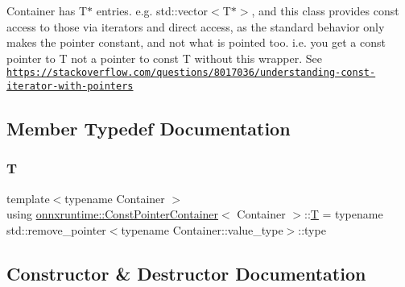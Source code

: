 Container has T$\ast$ entries. e.\+g. std\+::vector$<$\+T$\ast$$>$, and this class provides const access to those via iterators and direct access, as the standard behavior only makes the pointer constant, and not what is pointed too. i.\+e. you get a const pointer to T not a pointer to const T without this wrapper. See \href{https://stackoverflow.com/questions/8017036/understanding-const-iterator-with-pointers}{\tt https\+://stackoverflow.\+com/questions/8017036/understanding-\/const-\/iterator-\/with-\/pointers} 

\subsection{Member Typedef Documentation}
\mbox{\label{classonnxruntime_1_1ConstPointerContainer_ae78936c3220735b7dba8004b7d5c9888}} 
\subsubsection{\texorpdfstring{T}{T}}
{\footnotesize\ttfamily template$<$typename Container $>$ \\
using \mbox{\hyperlink{classonnxruntime_1_1ConstPointerContainer}{onnxruntime\+::\+Const\+Pointer\+Container}}$<$ Container $>$\+::\mbox{\hyperlink{classonnxruntime_1_1ConstPointerContainer_ae78936c3220735b7dba8004b7d5c9888}{T}} =  typename std\+::remove\+\_\+pointer$<$typename Container\+::value\+\_\+type$>$\+::type}



\subsection{Constructor \& Destructor Documentation}
\mbox{\label{classonnxruntime_1_1ConstPointerContainer_aa3a7b16295f4fc28a0c8ff0f6496d8bc}} 
